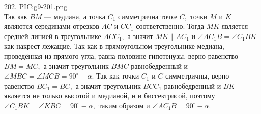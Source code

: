202. {{PIC:g9-201.png}}\\
Так как $BM$ --- медиана, а точка $C_1$ симметрична точке $C,$ точки $M$ и $K$ являются серединами отрезков $AC$ и $CC_1$ соответственно. Тогда $MK$ является средней линией в треугольнике $ACC_1,$ а значит $MK\parallel AC_1$ и $\angle AC_1B=\angle C_1BK$ как накрест лежащие. Так как в прямоугольном треугольнике медиана, проведённая из прямого угла, равна половине гипотенузы, верно равенство $BM=MC,$ а значит треугольник $BMC$ равнобедренный и $\angle MBC=\angle MCB=90^\circ-\alpha.$ Так как точки $C_1$ и $C$ симметричны, верно равенство $BC_1=BC,$ а значит треугольник $BCC_1$ равнобедренный и $BK$ является не только высотой и медианой, н и биссектрисой, поэтому $\angle C_1BK=\angle KBC=90^\circ-\alpha,$ таким образом и $\angle AC_1B=90^\circ-\alpha.$\\
